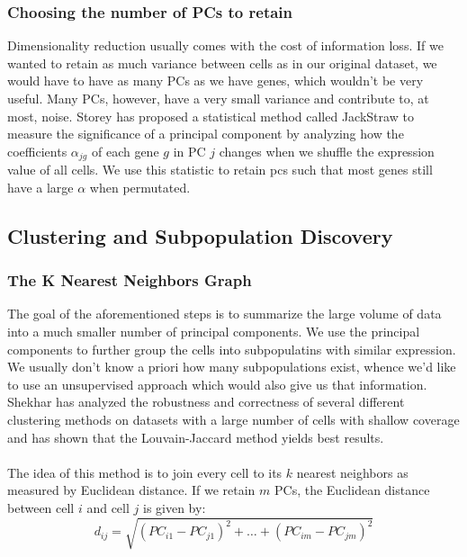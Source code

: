 
\subsubsection{Choosing the number of PCs to retain}
Dimensionality reduction usually comes with the cost of information loss. If we wanted to retain as much variance between cells as in our original dataset, we would have to have as many PCs as we have genes, which wouldn't be very useful. Many PCs, however, have a very small variance and contribute to, at most, noise. Storey \cite{chung2015statistical} has proposed a statistical method called JackStraw to measure the significance of a principal component by analyzing how the coefficients $\alpha_{jg}$ of each gene $g$ in PC $j$ changes when we shuffle the expression value of all cells. We use this statistic to retain pcs such that most genes still have a large $\alpha$ when permutated. 

\newpage
\subsection{Clustering and Subpopulation Discovery}
\subsubsection{The K Nearest Neighbors Graph}
The goal of the aforementioned steps is to summarize the large volume of data into a much smaller number of principal components. We use the principal components to further group the cells into subpopulatins with similar expression. We usually don't know a priori how many subpopulations exist, whence we'd like to use an unsupervised approach which would also give us that information. Shekhar\cite{shekhar2016comprehensive} has analyzed the robustness and correctness of several different clustering methods on datasets with a large number of cells with shallow coverage and has shown that the Louvain-Jaccard method yields best results. \\
\\
The idea of this method is to join every cell to its $k$ nearest neighbors as measured by Euclidean distance. If we retain $m$ PCs, the Euclidean distance between cell $i$ and cell $j$ is given by:
$$
d_{ij} = \sqrt{(PC_{i1} - PC_{j1})^2 + \dots + (PC_{im} - PC_{jm})^2}
$$

